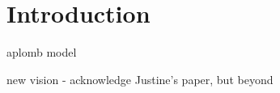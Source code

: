 
\section{Introduction}\label{sec:intro}

aplomb model

new vision - acknowledge Justine's paper, but beyond 
